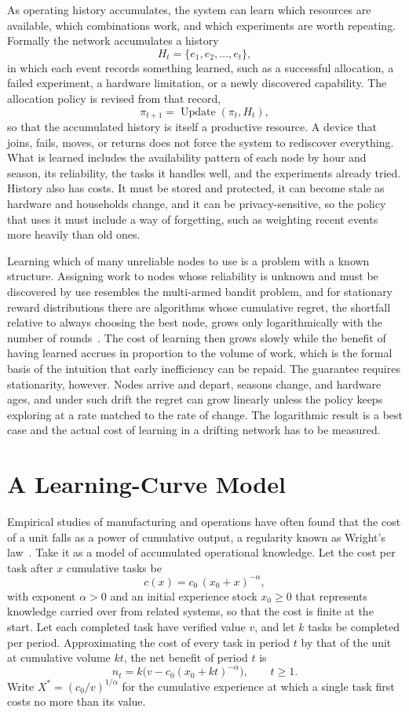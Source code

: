 As operating history accumulates, the system can learn which resources are available, which combinations work, and which experiments are worth repeating. Formally the network accumulates a history
\[
H_t=\{e_1,e_2,\dots,e_t\},
\]
in which each event records something learned, such as a successful allocation, a failed experiment, a hardware limitation, or a newly discovered capability. The allocation policy is revised from that record,
\[
\pi_{t+1}=\operatorname{Update}(\pi_t,H_t),
\]
so that the accumulated history is itself a productive resource. A device that joins, fails, moves, or returns does not force the system to rediscover everything. What is learned includes the availability pattern of each node by hour and season, its reliability, the tasks it handles well, and the experiments already tried. History also has costs. It must be stored and protected, it can become stale as hardware and households change, and it can be privacy-sensitive, so the policy that uses it must include a way of forgetting, such as weighting recent events more heavily than old ones.

Learning which of many unreliable nodes to use is a problem with a known structure. Assigning work to nodes whose reliability is unknown and must be discovered by use resembles the multi-armed bandit problem, and for stationary reward distributions there are algorithms whose cumulative regret, the shortfall relative to always choosing the best node, grows only logarithmically with the number of rounds~\cite{auer2002}. The cost of learning then grows slowly while the benefit of having learned accrues in proportion to the volume of work, which is the formal basis of the intuition that early inefficiency can be repaid. The guarantee requires stationarity, however. Nodes arrive and depart, seasons change, and hardware ages, and under such drift the regret can grow linearly unless the policy keeps exploring at a rate matched to the rate of change. The logarithmic result is a best case and the actual cost of learning in a drifting network has to be measured.

\section{A Learning-Curve Model}

Empirical studies of manufacturing and operations have often found that the cost of a unit falls as a power of cumulative output, a regularity known as Wright's law~\cite{wright1936}. Take it as a model of accumulated operational knowledge. Let the cost per task after $x$ cumulative tasks be
\[
c(x)=c_0\,(x_0+x)^{-\alpha},
\]
with exponent $\alpha>0$ and an initial experience stock $x_0\ge0$ that represents knowledge carried over from related systems, so that the cost is finite at the start. Let each completed task have verified value $v$, and let $k$ tasks be completed per period. Approximating the cost of every task in period $t$ by that of the unit at cumulative volume $kt$, the net benefit of period $t$ is
\[
n_t=k\bigl(v-c_0(x_0+kt)^{-\alpha}\bigr),\qquad t\ge1.
\]
Write $X^{*}=(c_0/v)^{1/\alpha}$ for the cumulative experience at which a single task first costs no more than its value.

